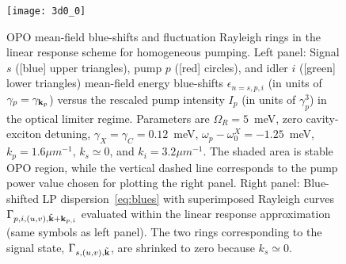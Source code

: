 %
\begin{figure}[tb]
\centering
\texttt{[image: 3d0\_0]} %
\caption{OPO mean-field blue-shifts and fluctuation
  Rayleigh rings in the linear response scheme for homogeneous
  pumping. Left panel: Signal $s$ ([blue] upper triangles), pump $p$
  ([red] circles), and idler $i$ ([green] lower triangles) mean-field
  energy blue-shifts $\epsilon_{n=s,p,i}$ (in units of $\gamma_p =
  \gamma_{\mathbf{k}_p}$) versus the rescaled pump intensity $I_p$ (in
  units of $\gamma_p^3$) in the optical limiter regime. Parameters are
  $\Omega_R=5$~meV, zero cavity-exciton detuning, $\gamma_X = \gamma_C
  = 0.12$~meV, $\omega_p - \omega_0^X = -1.25$~meV, $k_p=1.6{\mu
    m}^{-1}$, $k_s \simeq 0$, and $k_i=3.2{\mu m}^{-1}$.  The shaded
  area is stable OPO region, while the vertical dashed line
  corresponds to the pump power value chosen for plotting the right
  panel. Right panel: Blue-shifted LP dispersion~\eqref{eq:blues} with
  superimposed Rayleigh curves $\Gamma_{p,i,(u,v), \tilde{\mathbf{k}} +
    \mathbf{k}_{p, i}}$ evaluated within the linear response
  approximation (same symbols as left panel). The two rings
  corresponding to the signal state, $\Gamma_{s,(u,v),
    \tilde{\mathbf{k}}}$, are shrinked to zero because $k_s \simeq 0$.}
\label{fig:spect}
\end{figure}
%
